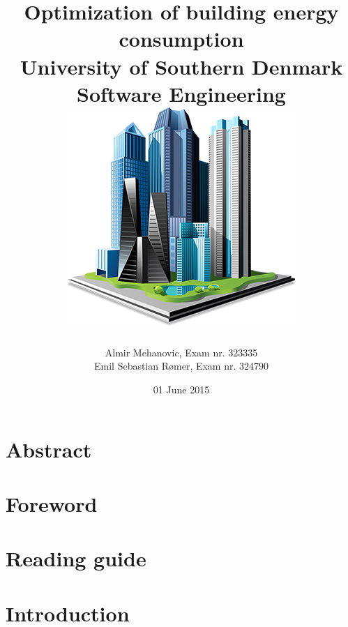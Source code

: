 \documentclass[35pt]{report}
\begin{document}
\title{
	{Optimization of building energy consumption}\\
	{\large University of Southern Denmark \\Software Engineering }\\
	{\includegraphics{frontpage.png}}
}
\author{Almir Mehanovic, Exam nr. 323335\\Emil Sebastian Rømer, Exam nr. 324790}
\date{01 June 2015}


\maketitle
{}

\chapter*{Abstract}


\chapter*{Foreword}


\tableofcontents

\chapter*{Reading guide}



\chapter{Introduction}

\end{document}
